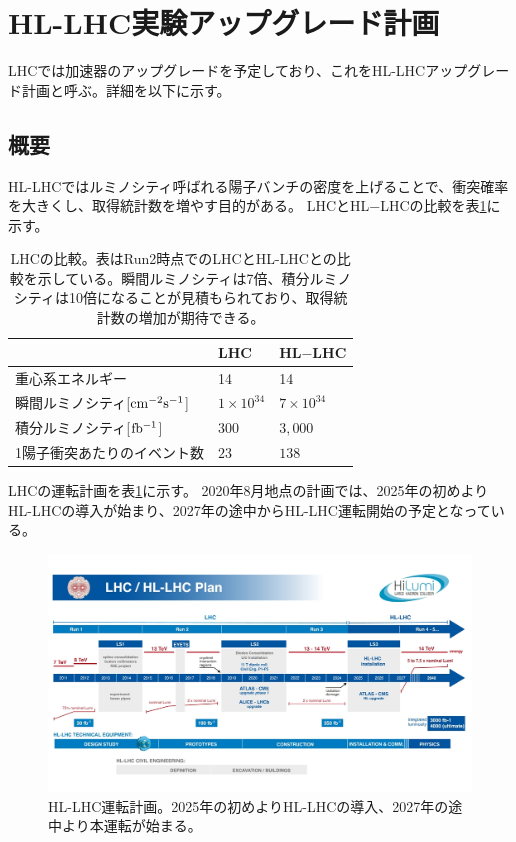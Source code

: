 \clearpage
\section{HL-LHC実験アップグレード計画}
LHCでは加速器のアップグレードを予定しており、これをHL-LHCアップグレード計画と呼ぶ。詳細を以下に示す。
\subsection{概要}
HL-LHCではルミノシティ呼ばれる陽子バンチの密度を上げることで、衝突確率を大きくし、取得統計数を増やす目的がある。
LHCとHL$-$LHCの比較を表\ref{compare_lhc}に示す。

\begin{table}[tbp]
\begin{center}
\caption[LHCの比較]{LHCの比較\cite{1-6}。表はRun2時点でのLHCとHL-LHCとの比較を示している。瞬間ルミノシティは7倍、積分ルミノシティは10倍になることが見積もられており、取得統計数の増加が期待できる。}
\label{compare_lhc}
  \begin{tabular}{|lll|} \hline
    & LHC & HL$-$LHC \\ \hline
    重心系エネルギー & 14 & 14 \\
    瞬間ルミノシティ[$\rm{cm^{-2}s^{-1}}$] & $1\times 10^{34}$ & $7\times10^{34}$ \\
    積分ルミノシティ[$\rm{fb^{-1}}$] & $300$ & $3,000$ \\
    1陽子衝突あたりのイベント数 & $23$ & $138$ \\ \hline 
  \end{tabular}
\end{center}
\end{table}

LHCの運転計画を表\ref{hllhc_plan}に示す。
2020年8月地点の計画では、2025年の初めよりHL-LHCの導入が始まり、2027年の途中からHL-LHC運転開始の予定となっている。
\begin{figure}[bpt]\centering
\includegraphics[width=12cm]{hllhc_plan}
\caption[HL-LHC運転計画]{HL-LHC運転計画\cite{1-7}。2025年の初めよりHL-LHCの導入、2027年の途中より本運転が始まる。}
\label{hllhc_plan}
\end{figure}

